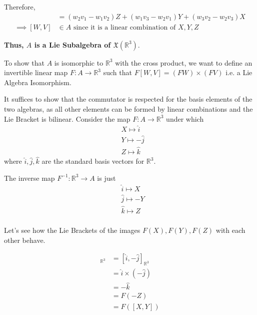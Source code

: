 \documentclass{article}
\newcommand{\R}{\mathbb{R}}
\begin{document}
Therefore,
\begin{align*}
  [W, V] &= \left(w_2v_1 - w_1v_2\right)Z + \left(w_1v_3 - w_2v_1\right)Y + \left(w_3v_2 - w_2v_3\right)X \\
  \implies [W, V] & \in A \text{ since it is a linear combination of }X, Y, Z
\end{align*}

\textbf{Thus, $A$ is a Lie Subalgebra of $\mathfrak{X}\left(\R^3\right)$}.

\vskip 0.5cm
To show that $A$ is isomorphic to $\R^3$ with the cross product, we want to define an invertible linear map $F : A \rightarrow \R^3$ such that $F[W, V] = \left(FW\right) \times \left(FV\right)$ i.e. a Lie Algebra Isomorphism.

\vskip 0.5cm

It suffices to show that the commutator is respected for the basis elements of the two algebras, as all other elements can be formed by linear combinations and the Lie Bracket is bilinear. Consider the map $F : A \rightarrow \R^3$ under which 
\begin{align*}
  &X \mapsto \hat{i} \\
  &Y \mapsto -\hat{j}\\
  &Z \mapsto \hat{k}
\end{align*} where $\hat{i}, \hat{j}, \hat{k}$ are the standard basis vectors for $\R^3$.

\vskip 0.5cm
The inverse map $F^{-1} : \R^3 \rightarrow A$ is just 
\begin{align*}
  &\hat{i} \mapsto X \\
  &\hat{j} \mapsto -Y \\
  &\hat{k} \mapsto Z \\
\end{align*}

Let's see how the Lie Brackets of the images $F(X), F(Y), F(Z)$ with each other behave. 

\begin{align*}
  [F(X), F(Y)]_{\R^3} &= [\hat{i}, -\hat{j}]_{\R^3} \\
  &= \hat{i} \times (-\hat{j}) \\
  &= -\hat{k} \\
  &= F(-Z) \\
  &= F\left([X,Y]\right)
\end{align*}
\end{document}
